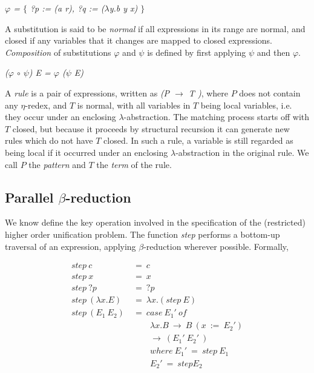 \begin{center}
\emph{$\varphi$ = $\{$ ?p := (a r), ?q := ($\lambda$y.b y x) $\}$}
\end{center}

\noindent
A substitution is said to be \emph{normal} if all expressions in its range are normal, and closed if any variables that it changes are mapped to closed expressions. \emph{Composition} of substitutions $\varphi$ and $\psi$ is defined by first applying $\psi$ and then $\varphi$.

\begin{center}
\emph{($\varphi$ $\circ$ $\psi$) E = $\varphi$ ($\psi$ E)}
\end{center}

\noindent
A \emph{rule} is a pair of expressions, written as \emph{(P $\rightarrow$ T )}, where $P$ does not contain any $\eta$-redex, and $T$ is normal, with all variables in $T$ being local variables, i.e. they occur under an enclosing $\lambda$-abstraction. The matching process starts off with $T$ closed, but because it proceeds by structural recursion it can generate new rules which do not have $T$ closed. In such a rule, a variable is still regarded as being local if it occurred under an enclosing $\lambda$-abstraction in the original rule. We call $P$ the \emph{pattern} and $T$ the \emph{term} of the rule.

\subsection{Parallel $\beta$-reduction}
We know define the key operation involved in the specification of the (restricted) higher order unification problem. The function \emph{step} performs a bottom-up traversal of an expression, applying $\beta$-reduction wherever possible. Formally,

\begin{equation*}
\begin{split}
step \: c \: &= \: c \\
step \: x &= \: x \\
step \: ?p &= \: ?p \\
step \: (\lambda x.E) &= \: \lambda x.(step \: E) \\
step \: (E_1 \: E_2 ) \: &= \: case \: E_1' \: of \\
& \qquad \lambda x.B \: \rightarrow \: B \: (x \: := \: E_2') \\
& \qquad \rightarrow \: (E_1' \: E_2' \:) \\
& \qquad where \: E_1' \: = \: step \: E_1 \\
& \qquad E_2' \: = \: step E_2
\end{split}
\end{equation*}

